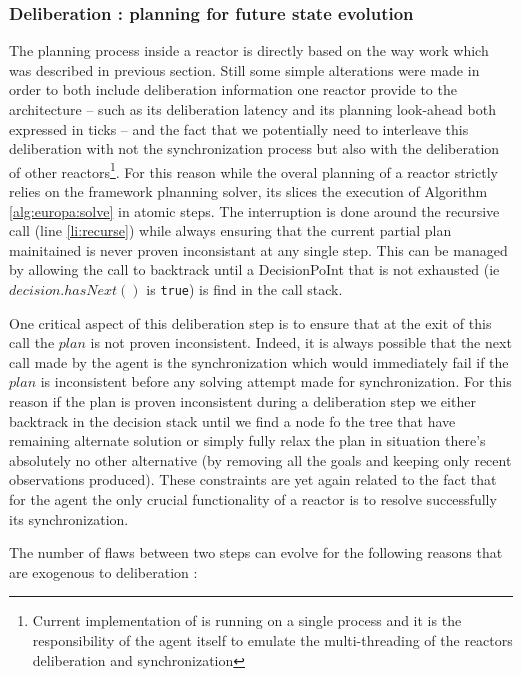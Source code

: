 \subsubsection{Deliberation : planning for future state evolution}
\label{sec:arch:plan}

The planning process inside a reactor is directly based on the way
\eu work which was described in previous section. Still some simple
alterations were made in order to both include deliberation
information one reactor provide to the architecture -- such as its
deliberation latency and its planning look-ahead both expressed in
ticks -- and the fact that we potentially need to interleave this
deliberation with not the synchronization process but also with the
deliberation of other reactors\footnote{Current implementation of \rx
  is running on a single process and it is the responsibility of the
  agent itself to emulate the multi-threading of the reactors
  deliberation and synchronization}. For this reason while the overal
planning of a \eu reactor strictly relies on the \eu framework
plnanning solver, its slices the execution of Algorithm
\ref{alg:europa:solve} in atomic steps. The interruption is done
around the recursive call (line \ref{li:recurse}) while always
ensuring that the current partial plan mainitained is never proven
inconsistant at any single step. This can be managed by allowing the
call to backtrack until a DecisionPoInt that is not exhausted (ie
$decision.hasNext()$ is \texttt{true}) is find in the call stack.

One critical aspect of this deliberation step is to ensure that at the
exit of this call the $plan$ is not proven inconsistent. Indeed, it is
always possible that the next call made by the agent is the
synchronization which would immediately fail if the $plan$ is
inconsistent before any solving attempt made for synchronization.  For
this reason if the plan is proven inconsistent during a deliberation
step we either backtrack in the decision stack until we find a node fo
the tree that have remaining alternate solution or simply fully relax
the plan in situation there's absolutely no other alternative (by
removing all the goals and keeping only recent observations
produced). These constraints are yet again related to the fact that
for the agent the only crucial functionality of a reactor is to
resolve successfully its synchronization.

The number of flaws between two steps can evolve for the following
reasons that are exogenous to deliberation :

